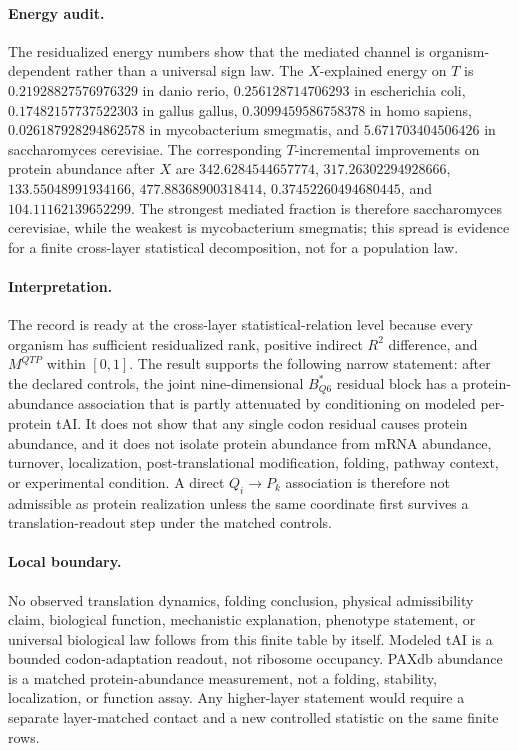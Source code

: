 \paragraph{Energy audit.} The residualized energy numbers show that the mediated channel is organism-dependent rather than a universal sign law.  The $X$-explained energy on $T$ is $0.21928827576976329$ in danio rerio, $0.256128714706293$ in escherichia coli, $0.17482157737522303$ in gallus gallus, $0.3099459586758378$ in homo sapiens, $0.026187928294862578$ in mycobacterium smegmatis, and $5.671703404506426$ in saccharomyces cerevisiae.  The corresponding $T$-incremental improvements on protein abundance after $X$ are $342.6284544657774$, $317.26302294928666$, $133.55048991934166$, $477.88368900318414$, $0.37452260494680445$, and $104.11162139652299$.  The strongest mediated fraction is therefore saccharomyces cerevisiae, while the weakest is mycobacterium smegmatis; this spread is evidence for a finite cross-layer statistical decomposition, not for a population law.

\paragraph{Interpretation.} The record is ready at the cross-layer statistical-relation level because every organism has sufficient residualized rank, positive indirect $R^2$ difference, and $M^{QTP}$ within $[0,1]$.  The result supports the following narrow statement: after the declared controls, the joint nine-dimensional $B^{*}_{Q6}$ residual block has a protein-abundance association that is partly attenuated by conditioning on modeled per-protein tAI.  It does not show that any single codon residual causes protein abundance, and it does not isolate protein abundance from mRNA abundance, turnover, localization, post-translational modification, folding, pathway context, or experimental condition.  A direct $Q_i \to P_k$ association is therefore not admissible as protein realization unless the same coordinate first survives a translation-readout step under the matched controls.

\paragraph{Local boundary.} No observed translation dynamics, folding conclusion, physical admissibility claim, biological function, mechanistic explanation, phenotype statement, or universal biological law follows from this finite table by itself.  Modeled tAI is a bounded codon-adaptation readout, not ribosome occupancy.  PAXdb abundance is a matched protein-abundance measurement, not a folding, stability, localization, or function assay.  Any higher-layer statement would require a separate layer-matched contact and a new controlled statistic on the same finite rows.

